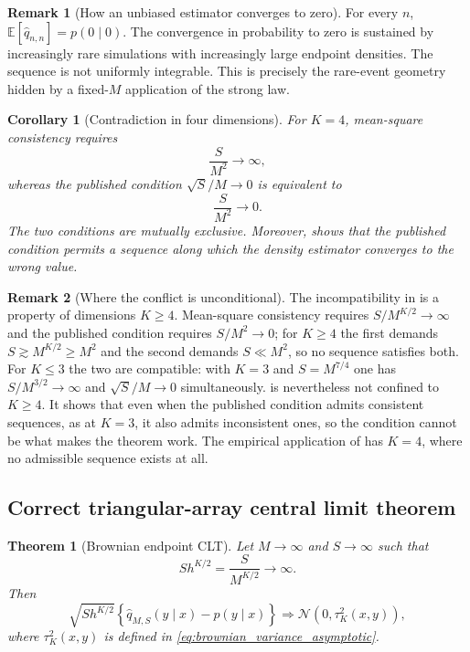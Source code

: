 \documentclass[11pt]{article}
\newtheorem{theorem}{Theorem}[section]
\newtheorem{corollary}{Corollary}
\theoremstyle{definition}
\newtheorem{remark}{Remark}
\newcommand{\E}{\mathbb{E}}
\newcommand{\Normal}{\mathcal{N}}
\begin{document}
\begin{remark}[How an unbiased estimator converges to zero]
For every $n$, $\E[\widehat q_{n,n}]=p(0\mid0)$. The convergence in probability to zero is sustained by increasingly rare simulations with increasingly large endpoint densities. The sequence is not uniformly integrable. This is precisely the rare-event geometry hidden by a fixed-$M$ application of the strong law.
\end{remark}

\begin{corollary}[Contradiction in four dimensions]\label{cor:contradiction}
For $K=4$, mean-square consistency requires
\[
\frac{S}{M^2}\longrightarrow\infty,
\]
whereas the published condition $\sqrt S/M\to0$ is equivalent to
\[
\frac{S}{M^2}\longrightarrow0.
\]
The two conditions are mutually exclusive. Moreover,  shows that the published condition permits a sequence along which the density estimator converges to the wrong value.
\end{corollary}

\begin{remark}[Where the conflict is unconditional]
The incompatibility in  is a property of dimensions $K\ge4$. Mean-square consistency requires $S/M^{K/2}\to\infty$ and the published condition requires $S/M^2\to0$; for $K\ge4$ the first demands $S\gtrsim M^{K/2}\ge M^2$ and the second demands $S\ll M^2$, so no sequence satisfies both. For $K\le3$ the two are compatible: with $K=3$ and $S=M^{7/4}$ one has $S/M^{3/2}\to\infty$ and $\sqrt S/M\to0$ simultaneously.  is nevertheless not confined to $K\ge4$. It shows that even when the published condition admits consistent sequences, as at $K=3$, it also admits inconsistent ones, so the condition cannot be what makes the theorem work. The empirical application of \citet{BrandtSantaClara2002} has $K=4$, where no admissible sequence exists at all.
\end{remark}

\subsection{Correct triangular-array central limit theorem}

\begin{theorem}[Brownian endpoint CLT]\label{thm:brownian_clt}
Let $M\to\infty$ and $S\to\infty$ such that
\begin{equation}\label{eq:effective_diverge}
S h^{K/2}=\frac{S}{M^{K/2}}\longrightarrow\infty.
\end{equation}
Then
\begin{equation}\label{eq:brownian_clt}
\sqrt{S h^{K/2}}
\left\{\widehat q_{M,S}(y\mid x)-p(y\mid x)\right\}
\Longrightarrow
\Normal\!\left(0,\tau_K^2(x,y)\right),
\end{equation}
where $\tau_K^2(x,y)$ is defined in \eqref{eq:brownian_variance_asymptotic}.
\end{theorem}
\end{document}
